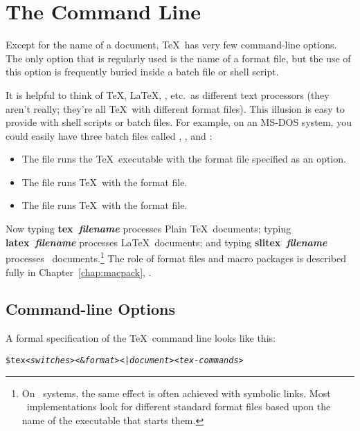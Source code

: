 \section{The Command Line}
\label{sec:clineopts}

Except for the name of a document, \TeX\ has very few command-line
options.  The only 
option that is regularly used is the name of a
format file, but the use of this option is frequently buried inside
a batch file or shell script.

It is helpful to think of \TeX, \LaTeX, \SliTeX, etc.~as
different text processors (they aren't really; they're all \TeX\ with
different format files).  This illusion is easy to provide with shell
scripts or batch files.  For example, on an MS-DOS system, you could
easily have three batch files called , ,
and :

\begin{itemize}
  \item The  file runs the \TeX\ executable
        with the 
        format file specified as an option.
  \item The  file runs \TeX\ with the 
        format file.
  \item The  file runs \TeX\ with the 
        format file.
\end{itemize}

Now typing \textbf{tex\ \textit{filename}} processes Plain \TeX\ documents;
typing \textbf{latex\ \textit{filename}} processes \LaTeX\ documents; and
typing \textbf{slitex\ \textit{filename}} processes \SliTeX\ 
documents.\footnote{On \Unix\ systems, the same effect is often achieved 
with symbolic links.  Most \Unix\ implementations look for different 
standard format files based upon the name of the executable that starts 
them.}  The role of format files and macro packages is described
fully in Chapter~\ref{chap:macpack}, \textit{}.

\subsection{Command-line Options}

A formal specification of the \TeX\ command 
line looks like this:

\begin{exindent}
\begin{alltt}
\$ tex <\textit{switches}> <&\textit{format}> <|\textit{document}> <\textit{tex-commands}>
\end{alltt}
\end{exindent}

